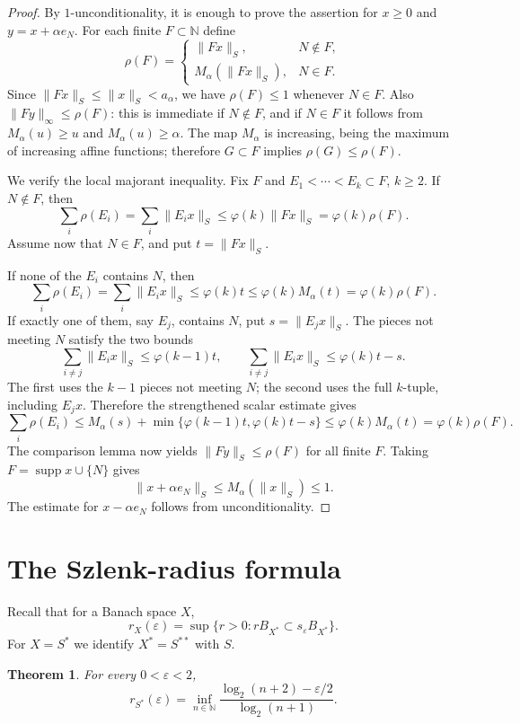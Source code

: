 \documentclass[11pt]{article}
\newtheorem{theorem}{Theorem}
\newcommand{\N}{\mathbb N}
\newcommand{\eps}{\varepsilon}
\newcommand{\ph}{\varphi}
\DeclareMathOperator{\supp}{supp}
\begin{document}
\begin{proof}
By $1$-unconditionality, it is enough to prove the assertion for $x\ge 0$ and
$y=x+\alpha e_N$.  For each finite $F\subset\N$ define
\[
 \rho(F)=
 \begin{cases}
  \|Fx\|_S, & N\notin F,\\
  M_\alpha(\|Fx\|_S), & N\in F.
 \end{cases}
\]
Since $\|Fx\|_S\le \|x\|_S<a_\alpha$, we have $\rho(F)\le 1$ whenever $N\in F$.
Also $\|Fy\|_\infty\le \rho(F)$: this is immediate if $N\notin F$, and if $N\in F$ it follows
from $M_\alpha(u)\ge u$ and $M_\alpha(u)\ge \alpha$.  The map $M_\alpha$ is increasing, being
the maximum of increasing affine functions; therefore $G\subset F$ implies $\rho(G)\le\rho(F)$.

We verify the local majorant inequality.  Fix $F$ and $E_1<\cdots<E_k\subset F$, $k\ge 2$.
If $N\notin F$, then
\[
 \sum_i\rho(E_i)=\sum_i\|E_i x\|_S\le \ph(k)\|Fx\|_S=\ph(k)\rho(F).
\]
Assume now that $N\in F$, and put $t=\|Fx\|_S$.

If none of the $E_i$ contains $N$, then
\[
 \sum_i\rho(E_i)=\sum_i\|E_i x\|_S\le \ph(k)t\le \ph(k)M_\alpha(t)=\ph(k)\rho(F).
\]
If exactly one of them, say $E_j$, contains $N$, put $s=\|E_jx\|_S$.  The pieces not meeting
$N$ satisfy the two bounds
\[
 \sum_{i\ne j}\|E_i x\|_S\le \ph(k-1)t,
 \qquad
 \sum_{i\ne j}\|E_i x\|_S\le \ph(k)t-s.
\]
The first uses the $k-1$ pieces not meeting $N$; the second uses the full $k$-tuple, including
$E_jx$.  Therefore the strengthened scalar estimate gives
\[
 \sum_i\rho(E_i)
 \le M_\alpha(s)+\min\{\ph(k-1)t,\ph(k)t-s\}
 \le \ph(k)M_\alpha(t)
 =\ph(k)\rho(F).
\]
The comparison lemma now yields $\|Fy\|_S\le\rho(F)$ for all finite $F$.  Taking
$F=\supp x\cup\{N\}$ gives
\[
 \|x+\alpha e_N\|_S\le M_\alpha(\|x\|_S)\le 1.
\]
The estimate for $x-\alpha e_N$ follows from unconditionality.
\end{proof}

\section{The Szlenk-radius formula}

Recall that for a Banach space $X$,
\[
 r_X(\eps)=\sup\{r>0:rB_{X^*}\subset s_\eps B_{X^*}\}.
\]
For $X=S^*$ we identify $X^*=S^{**}$ with $S$.

\begin{theorem}
For every $0<\eps<2$,
\[
 r_{S^*}(\eps)=
 \inf_{n\in\N}\frac{\log_2(n+2)-\eps/2}{\log_2(n+1)}.
\]
\end{theorem}
\end{document}
